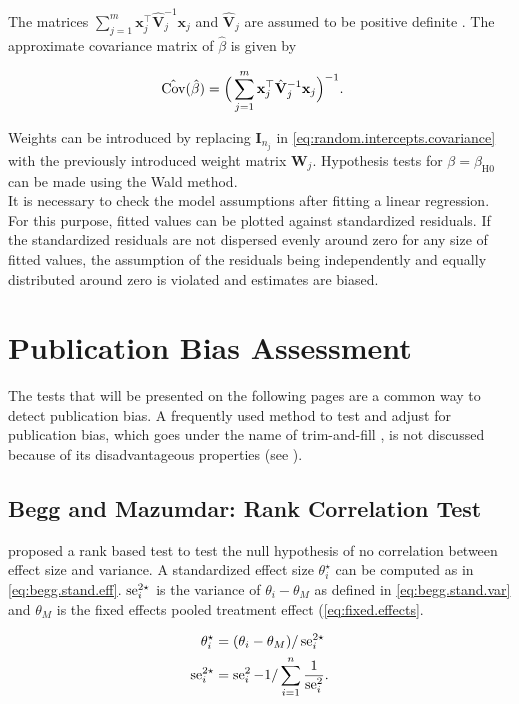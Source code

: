 \documentclass[11pt,a4paper,twoside]{book}\usepackage[]{graphicx}\usepackage[]{color}
\begin{document}
The matrices $\sum_{j = 1}^m \mathbf{x}_j^\top \hat{\mathbf{V}}_j^{-1} \mathbf{x}_j$ and $\hat{\mathbf{V}}_j$ are assumed to be positive definite  . The approximate covariance matrix of $\hat{\beta}$ is given by

\begin{align}
\hat{\operatorname{Cov}}(\hat{\beta}) &= \Big( \sum_{j = 1}^m \mathbf{x}_j^\top \hat{\mathbf{V}}_j^{-1} \mathbf{x}_j \Big)^{-1}. \nonumber
\end{align}

Weights can be introduced by replacing $\mathbf{I}_{n_j}$ in \eqref{eq:random.intercepts.covariance} with the previously introduced weight matrix $\mathbf{W}_j$. Hypothesis tests for $\beta = \beta_\textrm{H0}$ can be made using the Wald method. \\
It is necessary to check the model assumptions after fitting a linear regression. For this purpose, fitted values can be plotted against standardized residuals. If the standardized residuals are not dispersed evenly around zero for any size of fitted values, the assumption of the residuals being independently and equally distributed around zero is violated and estimates are biased. \\




\section{Publication Bias Assessment}
The tests that will be presented on the following pages are a common way to detect publication bias. A frequently used method to test and adjust for publication bias, which goes under the name of trim-and-fill \citep{trimfill}, is not discussed because of its disadvantageous properties (see \eg \citealp{Moreno.2009}).\\

\subsection{Begg and Mazumdar: Rank Correlation Test} \label{sec:Begg}
\citet{Begg} proposed a rank based test to test the null hypothesis of no correlation between effect size and variance.
A standardized effect size $\theta_i^\star$ can be computed as in \eqref{eq:begg.stand.eff}. $\operatorname{se}_i^{2\star}$ is the variance of $\theta_i - \theta_M$ as defined in \eqref{eq:begg.stand.var} and $\theta_M$ is the fixed effects pooled treatment effect (\eqref{eq:fixed.effects}. 

\begin{align}
\theta_i^\star &= (\theta_i - \theta_M)/\operatorname{se}_i^{2\star} \label{eq:begg.stand.eff}  \\
\operatorname{se}_i^{2\star} &= \operatorname{se}_i^2 - 1/\sum_{i = 1}^n\frac{1}{\operatorname{se}_i^2}. \label{eq:begg.stand.var} 
\end{align}
\end{document}
